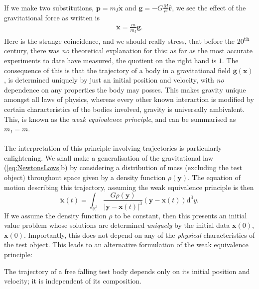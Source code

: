 \documentclass[11pt,fleqn]{report}
\begin{document}
\paragraph{} If we make two substitutions, $\mathbf{p} = m_I \dot{\mathbf{x}}$ and $\mathbf{g} = - G\tfrac{M}{r^2}\hat{\mathbf{r}}$, we see the effect of the gravitational force as written is
	\begin{align}
		\ddot{\mathbf{x}} = \frac{m}{m_I} \mathbf{g}.
	\end{align}
Here is the strange coincidence, and we should really stress, that before the 20\textsuperscript{th} century, there was \textit{no} theoretical explanation for this: as far as the most accurate experiments to date have measured, the quotient on the right hand is $1$. The consequence of this is that the trajectory of a body in a gravitational field $\mathbf{g}(\mathbf{x})$, is determined uniquely by just an initial position and velocity, with \textit{no} dependence on any properties the body may posses. This makes gravity unique amongst all laws of physics, whereas every other known interaction is modified by certain characteristics of the bodies involved, gravity is universally ambivalent. This, is known as the \textit{weak equivalence principle}, and can be summarised as $m_I = m$.

\paragraph{}
The interpretation of this principle involving trajectories is particularly enlightening.
We shall make a generalisation of the gravitational law (\ref{eq:NewtonsLaws}b) by considering a distribution of mass (excluding the test object) throughout space given by a density function $ \rho(\mathbf{y}) $.
The equation of motion describing this trajectory, assuming the weak equivalence principle is then
	\begin{equation}\label{key}
		\ddot{\mathbf{x}}(t) = \int_{\mathbb{R}^3} \frac{G\rho(\mathbf{y})}{|\mathbf{y}-\mathbf{x}(t)|^3} \left(\mathbf{y} - \mathbf{x}(t)\right) \mathrm{d}^3y.
	\end{equation}
If we assume the density function $ \rho $ to be constant, then this presents an initial value problem whose solutions are determined \textit{uniquely} by the initial data $ \mathbf{x}(0) $, $ \dot{\mathbf{x}}(0) $. Importantly, this does not depend on any of the \textit{physical} characteristics of the test object. This leads to an alternative formulation of the weak equivalence principle:
	\begin{displayquote}
		The trajectory of a free falling test body depends only on its initial position and velocity; it is independent of its composition.
	\end{displayquote}
\end{document}

